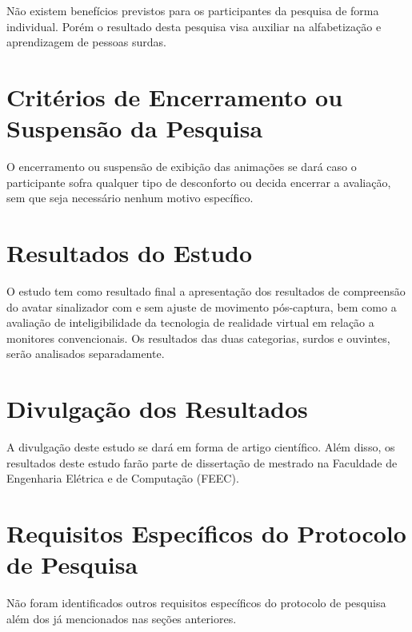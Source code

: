 \documentclass[a4paper,11pt,titlepage,singlespacing]{article}
\begin{document}
Não existem benefícios previstos para os participantes da pesquisa de forma individual. Porém o resultado desta pesquisa visa auxiliar na alfabetização e aprendizagem de pessoas surdas.

\section{Critérios de Encerramento ou Suspensão da Pesquisa}
O encerramento ou suspensão de exibição das animações se dará caso o participante sofra qualquer tipo de desconforto ou decida encerrar a avaliação, sem que seja necessário nenhum motivo específico. 

\section{Resultados do Estudo}
O estudo tem como resultado final a apresentação dos resultados de compreensão do avatar sinalizador com e sem ajuste de movimento pós-captura, bem como a avaliação de inteligibilidade da tecnologia de realidade virtual em relação a monitores convencionais. Os resultados das duas categorias, surdos e ouvintes, serão analisados separadamente.

\section{Divulgação dos Resultados}
A divulgação deste estudo se dará em forma de artigo científico. Além disso, os resultados deste estudo farão parte de dissertação de mestrado na Faculdade de Engenharia Elétrica e de Computação (FEEC).

\section{Requisitos Específicos do Protocolo de Pesquisa}
Não foram identificados outros requisitos específicos do protocolo de pesquisa além dos já mencionados nas seções anteriores.






\newpage
{}

\end{document}
